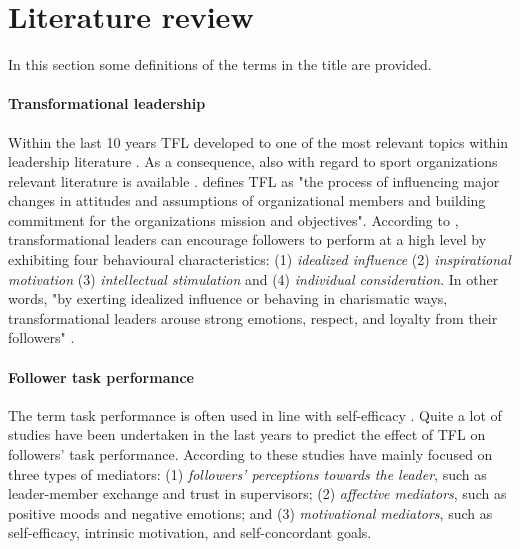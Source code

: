 \documentclass[	
	12pt, %
	a4paper, %
  abstracton
]{scrartcl}\usepackage[]{graphicx}\usepackage[]{color}
\begin{document}
\section*{Literature review}
In this section some definitions of the  terms in the title are provided.

\paragraph{Transformational leadership}
\label{def_trans_lead}
Within the last 10 years TFL developed to one of the most relevant topics within leadership literature \cite{Chi2012, Bass2000, Judge2004, Avolio2009}. As a consequence, also with regard to sport organizations relevant literature is available \cite{Soucie1994, Hoye2006, Hoye2003, Hoye2004, Chelladurai1980, Hovden2000, Pfister2009, Doherty1996}.
 defines TFL as "the process of influencing major changes in attitudes and assumptions of organizational members and building commitment for the organizations mission and objectives". According to , transformational leaders can encourage followers to perform at a high level by exhibiting four behavioural characteristics: (1)\textit{ idealized influence} (2)\textit{ inspirational motivation} (3) \textit{intellectual stimulation} and (4) \textit{individual consideration}. In other words, "by exerting idealized influence or behaving in charismatic ways, transformational leaders arouse strong emotions, respect, and loyalty from their followers" \cite[p. 2-3]{Liang2012}. 


\paragraph{Follower task performance}
The term task performance is often used in line with self-efficacy \cite{Shea1999, Walumbwa2004}. Quite a lot of studies have been undertaken in the last years to predict the effect of TFL on followers' task performance. According to  these studies have mainly focused on three types of mediators: (1) \textit{followers' perceptions towards the leader},
such as leader-member exchange and trust in supervisors; (2) \textit{affective mediators}, such as positive moods and negative emotions; and (3) \textit{motivational mediators}, such as self-efficacy, intrinsic motivation, and self-concordant goals.
\end{document}
